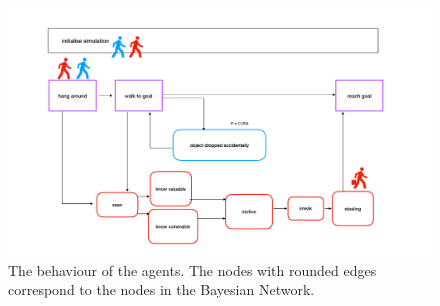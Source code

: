 \begin{figure}[htbp]
\begin{center}
\includegraphics[width=\linewidth]{images/grotemarkt.pdf}
\end{center}
\caption{The behaviour of the agents. The nodes with rounded edges correspond to the nodes in the Bayesian Network.}
\label{behaviourGM}
\end{figure}




